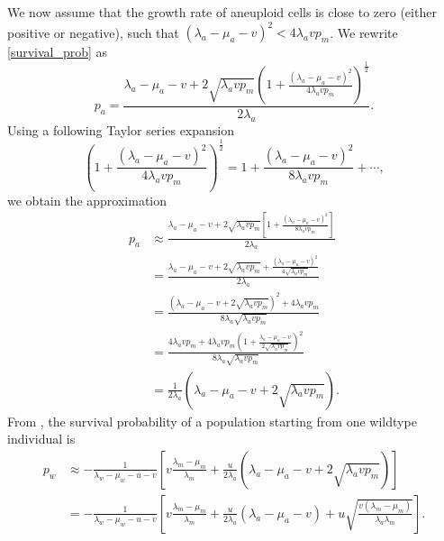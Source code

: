 \documentclass[12pt]{extarticle}
\begin{document}
We now assume that the growth rate of aneuploid cells is close to zero (either positive or negative), such that  $\left(\lambda_a-\mu_a-v\right)^2 < 4\lambda_avp_m$.
We rewrite \cref{survival_prob} as
\begin{equation}
p_a=\frac{\lambda_a-\mu_a-v+2\sqrt{\lambda_a vp_m}\left(1+\frac{\left(\lambda_a-\mu_a-v\right)^2}{4\lambda_avp_m}\right)^{\frac12}}{2\lambda_a} .
\end{equation}
Using a following Taylor series expansion
\begin{equation*}
\left(1+\frac{\left(\lambda_a-\mu_a-v\right)^2}{4\lambda_avp_m}\right)^{\frac{1}{2}}=1+\frac{\left(\lambda_a-\mu_a-v\right)^2}{8\lambda_avp_m}+\cdots,
\end{equation*}
we obtain the approximation
\begin{equation}
\begin{aligned}
p_a&\approx\frac{\lambda_a-\mu_a-v+2\sqrt{\lambda_a vp_m}\left[1+\frac{\left(\lambda_a-\mu_a-v\right)^2}{8\lambda_avp_m}\right]}{2\lambda_a}\\
&=\frac{\lambda_a-\mu_a-v+2\sqrt{\lambda_a vp_m}+\frac{\left(\lambda_a-\mu_a-v\right)^2}{4\sqrt{\lambda_avp_m}}}{2\lambda_a}\\
&=\frac{\left(\lambda_a-\mu_a-v+2\sqrt{\lambda_avp_m}\right)^2+4\lambda_avp_m}{8\lambda_a\sqrt{\lambda_avp_m}}\\
&=\frac{4\lambda_avp_m+4\lambda_avp_m\left(1+\frac{\lambda_a-\mu_a-v}{2\sqrt{\lambda_avp_m}}\right)^2}{8\lambda_a\sqrt{\lambda_avp_m}}\\
&=\frac{1}{2\lambda_a}\left(\lambda_a-\mu_a-v+2\sqrt{\lambda_avp_m}\right).
\end{aligned}
\end{equation}
From , %
the survival probability of a population starting from one wildtype individual is
\begin{equation}\label{scenario3}
\begin{aligned}
p_w&\approx-\frac{1}{\lambda_w-\mu_w-u-v}\left[v\frac{\lambda_m-\mu_m}{\lambda_m}+\frac{u}{2\lambda_a}\left(\lambda_a-\mu_a-v+2\sqrt{\lambda_avp_m}\right)\right]\\
&=-\frac{1}{\lambda_w-\mu_w-u-v}\left[v\frac{\lambda_m-\mu_m}{\lambda_m}+\frac{u}{2\lambda_a}\left(\lambda_a-\mu_a-v\right)+u\sqrt{\frac{v\left(\lambda_m-\mu_m\right)}{\lambda_a\lambda_m}}\right].
\end{aligned}
\end{equation}
\end{document}
